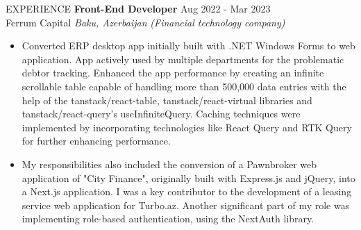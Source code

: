 \documentclass{resume} %
\begin{document}
\begin{rSection}{EXPERIENCE}
\textbf{Front-End Developer} \hfill Aug 2022 - Mar 2023\\
Ferrum Capital \hfill \textit{Baku, Azerbaijan}
\textit{(Financial technology company)}
 \begin{itemize}
    \itemsep -3pt {}
    \item 
    Converted ERP desktop app initially built with .NET Windows Forms to web application. App actively used by multiple departments for the problematic debtor tracking. Enhanced the app performance by creating an infinite scrollable table capable of handling more than 500,000 data entries with the help of the tanstack/react-table, tanstack/react-virtual libraries and tanstack/react-query's useInfiniteQuery. Caching techniques were implemented by incorporating technologies like React Query and RTK Query for further enhancing performance.
    \item 
    My responsibilities also included the conversion of a Pawnbroker web application of "City Finance", originally built with Express.js and jQuery, into a Next.js application. I was a key contributor to the development of a leasing service web application for Turbo.az. Another significant part of my role was implementing role-based authentication, using the NextAuth library.
 \end{itemize}
\end{rSection} 

\end{document}
